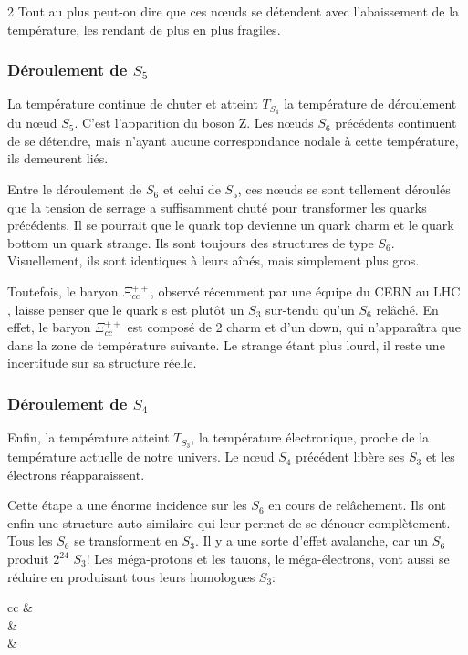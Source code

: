 \begin{multicols}{2}
Tout au plus peut-on dire que ces nœuds se détendent avec
l'abaissement de la température, les rendant de plus en plus fragiles.

\subsubsection{Déroulement de $S_5$}

La température continue de chuter et atteint $T_{S_4}$ la température de
déroulement du nœud $S_5$. C'est l'apparition du boson Z.
Les nœuds $S_6$ précédents continuent de se détendre, mais n'ayant
aucune correspondance nodale à cette température, ils demeurent liés.

Entre le déroulement de $S_6$ et celui de $S_5$, ces nœuds se sont
tellement déroulés que la tension de serrage a suffisamment chuté
pour transformer les quarks précédents. Il se pourrait que le quark top
devienne un quark charm et le quark bottom un quark strange. Ils sont
toujours des structures de type $S_6$. Visuellement, ils sont identiques
à leurs aînés, mais simplement plus gros.

Toutefois, le baryon $\Xi_{cc}^{++}$, observé récemment par une équipe du CERN
au LHC  \cite{cern-lhcb-charmed2022}, laisse penser que le quark s est plutôt un $S_3$ sur-tendu qu'un
$S_6$ relâché. En effet, le baryon $\Xi_{cc}^{++}$ est composé de 2 charm et d'un
down, qui n'apparaîtra que dans la zone de température suivante. Le strange étant
plus lourd, il reste une incertitude sur sa structure réelle.

\subsubsection{Déroulement de $S_4$}

Enfin, la température atteint $T_{S_3}$, la température électronique,
proche de la température actuelle de notre univers. Le nœud $S_4$
précédent libère ses $S_3$ et les électrons réapparaissent.

Cette étape a une énorme incidence sur les $S_6$ en cours de
relâchement. Ils ont enfin une structure auto-similaire qui leur
permet de se dénouer complètement. Tous les $S_6$ se transforment en
$S_3$. Il y a une sorte d'effet avalanche, car un $S_6$ produit $2^{24}$ $S_3$!
Les méga-protons et les tauons, le méga-électrons, vont aussi se
réduire en produisant tous leurs homologues $S_3$:

\begin{center}
	\begin{tblr}{cc}
		       &         \\
		 &  \\
		 &  \\
	\end{tblr}
\end{center}


\end{multicols}
